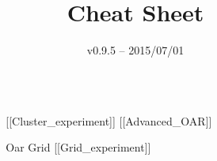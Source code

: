 \documentclass[final]{beamer}
\title{Cheat Sheet} %
\author{v0.9.5 -- 2015/07/01} %
\institute{\url{http://grid5000.fr/}} %
\newlength{\sepwid}
\newlength{\onecolwid}
\begin{document}

\setlength{\belowcaptionskip}{2ex} %
\setlength\belowdisplayshortskip{2ex} %

\begin{frame}[t] %

\begin{columns}[t] %

\begin{column}{\sepwid}\end{column} %

\begin{column}{\onecolwid} %


\begin{alertblock}{[[Cluster\_experiment]]     [[Advanced\_OAR]]}

\end{alertblock}



\begin{alertblock}{Oar Grid [[Grid\_experiment]]}

\end{alertblock}


\end{column} %

\begin{column}{\sepwid}\end{column} %


\end{columns}
\end{frame}
\end{document}
